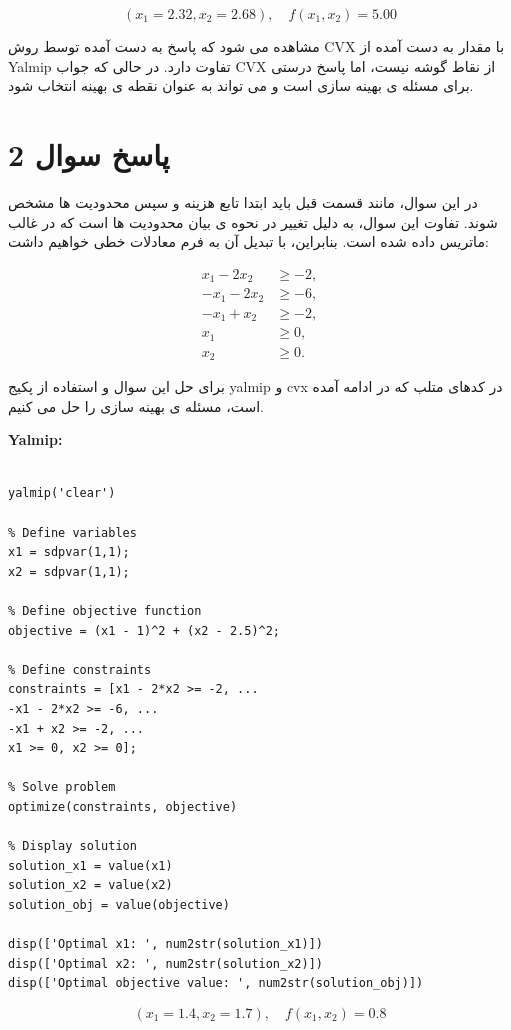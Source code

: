 \[
(x_1 = 2.32, x_2 = 2.68) , \quad f(x_1, x_2) = 5.00
\]

مشاهده می شود که پاسخ به دست آمده توسط روش 
CVX
با مقدار به دست آمده از 
Yalmip
تفاوت دارد. در حالی که جواب CVX از نقاط گوشه نیست، اما پاسخ درستی برای مسئله ی بهینه سازی است و می تواند به عنوان نقطه ی بهینه انتخاب شود.
\section{پاسخ سوال 2}
در این سوال، مانند قسمت قبل باید ابتدا تابع هزینه و سپس محدودیت ها مشخص شوند. تفاوت این سوال، به دلیل تغییر در نحوه ی بیان محدودیت ها است که در غالب ماتریس داده شده است. بنابراین، با تبدیل آن به فرم معادلات خطی خواهیم داشت:

\begin{align*}
	x_1 - 2x_2 &\geq -2, \\
	-x_1 - 2x_2 &\geq -6, \\
	-x_1 + x_2 &\geq -2, \\
	x_1 &\geq 0, \\
	x_2 &\geq 0.
\end{align*}

برای حل این سوال و استفاده از پکیج
 yalmip
  و
 cvx
  در کدهای متلب که در ادامه آمده است، مسئله ی بهینه سازی را حل می کنیم.

\textbf{Yalmip:}
\begin{latin}
	\begin{lstlisting}[frame=single,style=Matlab-Pyglike]
		
yalmip('clear')

% Define variables
x1 = sdpvar(1,1);
x2 = sdpvar(1,1);

% Define objective function
objective = (x1 - 1)^2 + (x2 - 2.5)^2;

% Define constraints
constraints = [x1 - 2*x2 >= -2, ...
-x1 - 2*x2 >= -6, ...
-x1 + x2 >= -2, ...
x1 >= 0, x2 >= 0];

% Solve problem
optimize(constraints, objective)

% Display solution
solution_x1 = value(x1)
solution_x2 = value(x2)
solution_obj = value(objective)

disp(['Optimal x1: ', num2str(solution_x1)])
disp(['Optimal x2: ', num2str(solution_x2)])
disp(['Optimal objective value: ', num2str(solution_obj)])
	\end{lstlisting}
\end{latin}

\[
(x_1 = 1.4, x_2 = 1.7) , \quad f(x_1, x_2) = 0.8
\]

